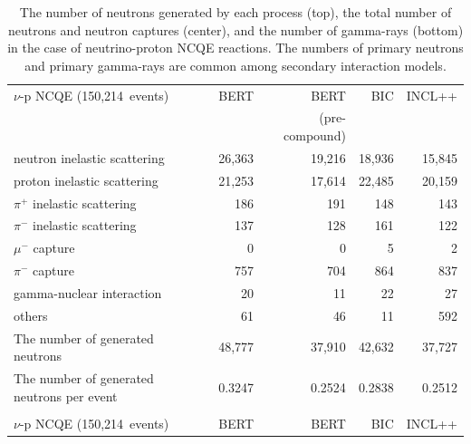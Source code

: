 \begin{table}[h]
	\centering
	\caption[The number of neutrons generated by each process, the total number of neutrons and neutron captures, and the number of gamma-rays in the case of neutrino-proton NCQE reactions]{
	The number of neutrons generated by each process (top), the total number of neutrons and neutron captures (center), and the number of gamma-rays (bottom) in the case of neutrino-proton NCQE reactions.
	The numbers of primary neutrons and primary gamma-rays are common among secondary interaction models.
	}\label{Others_tab:pre_gamma_nuncqe_p}
	\vs
	\begin{tabular}{lrrrr} \hline \hline
		$\nu$-p NCQE (150,214~events)                       &    BERT &           BERT &     BIC &  INCL++ \\
		                                                    &         & (pre-compound) &         &         \\ \hline
		neutron inelastic scattering                        &  26,363 &         19,216 &  18,936 &  15,845 \\
		proton inelastic scattering                         &  21,253 &         17,614 &  22,485 &  20,159 \\
		$\pi^{+}$ inelastic scattering                      &     186 &            191 &     148 &     143 \\
		$\pi^{-}$ inelastic scattering                      &     137 &            128 &     161 &     122 \\
		$\mu^{-}$ capture                                   &       0 &              0 &       5 &       2 \\
		$\pi^{-}$ capture                                   &     757 &            704 &     864 &     837 \\
		gamma-nuclear interaction                           &      20 &             11 &      22 &      27 \\
		others                                              &      61 &             46 &      11 &     592 \\ \hline
		The number of generated neutrons                    &  48,777 &         37,910 &  42,632 &  37,727 \\ \hline
		The number of generated neutrons per event          &  0.3247 &         0.2524 &  0.2838 &  0.2512 \\ \hline \hline
		&&& \\ \hline \hline
		$\nu$-p NCQE (150,214~events)                       &    BERT &           BERT &     BIC &  INCL++ \\

\end{tabular}
\end{table}
